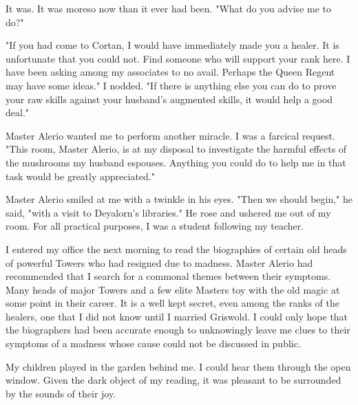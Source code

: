 \documentclass{article}
\begin{document}
It was. It was moreso now than it ever had been. "What do you advise me to do?"

"If you had come to Cortan, I would have immediately made you a healer. It is unfortunate that you could not. Find someone who will support your rank here. I have been asking among my associates to no avail. Perhaps the Queen Regent may have some ideas." I nodded. "If there is anything else you can do to prove your raw skills against your husband's augmented skills, it would help a good deal."

Master Alerio wanted me to perform another miracle. I was a farcical request. "This room, Master Alerio, is at my disposal to investigate the harmful effects of the mushrooms my husband espouses. Anything you could do to help me in that task would be greatly appreciated." 

Master Alerio smiled at me with a twinkle in his eyes. "Then we should begin," he said, "with a visit to Deyalorn's libraries." He rose and ushered me out of my room. For all practical purposes, I was a student following my teacher.

\vspace{.5 cm} 

I entered my office the next morning to read the biographies of certain old heads of powerful Towers who had resigned due to madness. Master Alerio had recommended that I search for a commonal themes between their symptoms. Many heads of major Towers and a few elite Masters toy with the old magic at some point in their career. It is a well kept secret, even among the ranks of the healers, one that I did not know until I married Griswold. I could only hope that the biographers had been accurate enough to unknowingly leave me clues to their symptoms of a madness whose cause could not be discussed in public.

My children played in the garden behind me. I could hear them through the open window. Given the dark object of my reading, it was pleasant to be surrounded by the sounds of their joy.
\end{document}
